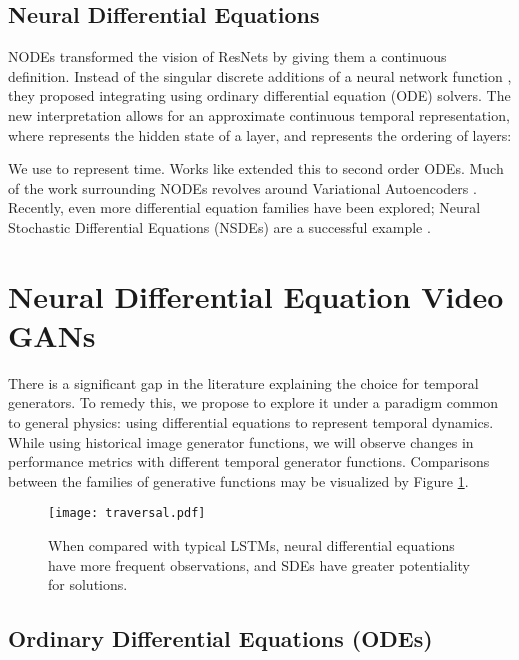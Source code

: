 \documentclass[tablecaption=bottom,pmlr]{jmlr}
\begin{document}
\subsection{Neural Differential Equations}

NODEs \citep{neuralode} transformed the vision of ResNets \citep{resnet} by giving them a continuous definition. Instead of the singular discrete additions of a neural network function , they proposed integrating using ordinary differential equation (ODE) solvers.  The new interpretation allows for an approximate continuous temporal representation, where  represents the hidden state of a layer, and  represents the ordering of layers:




We use  to represent time.
Works like  \citep{ode2vae} extended this to second order ODEs. Much of the work surrounding NODEs revolves around Variational Autoencoders \citep{neuralode, ffjord, ode2vae}. Recently, even more differential equation families have been explored; Neural Stochastic Differential Equations (NSDEs) are a successful example \citep{sde, sde2}.

\section{Neural Differential Equation Video GANs}

There is a significant gap in the literature explaining the choice for temporal generators. To remedy this, we propose to explore it under a paradigm common to general physics: using differential equations to represent temporal dynamics. While using historical image generator functions, we will observe changes in performance metrics with different temporal generator functions. Comparisons between the families of generative functions may be visualized by Figure \ref{fig:latent_space}.

\begin{figure}
    \centering
    \texttt{[image: traversal.pdf]}
    \caption{When compared with typical LSTMs, neural differential equations have more frequent observations, and SDEs have greater potentiality for solutions.}
    \label{fig:latent_space}
\end{figure}

\subsection{Ordinary Differential Equations (ODEs)}
\end{document}
